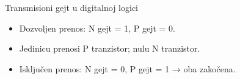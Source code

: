 \begin{frame}[label=09_3-s066]{Transmisioni gejt u digitalnoj logici}
\begin{itemize}
\item Dozvoljen prenos: N gejt = 1, P gejt = 0.
\item Jedinicu prenosi P tranzistor; nulu N tranzistor.
\item Isključen prenos: N gejt = 0, P gejt = 1 → oba zakočena.
\end{itemize}\begin{center}

\end{center}
\end{frame}
